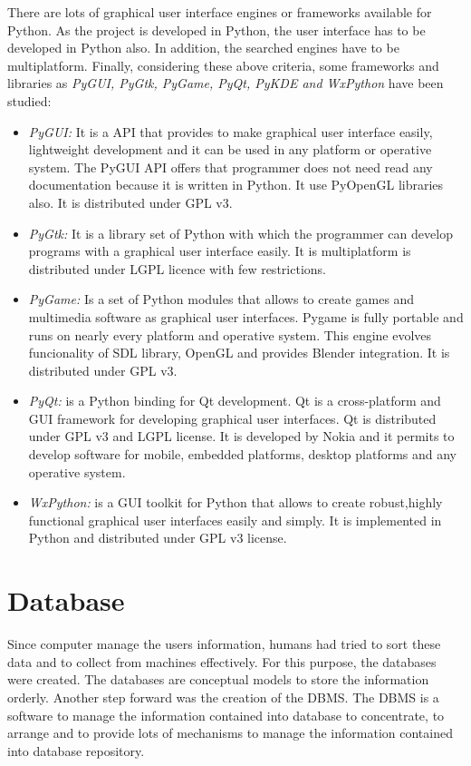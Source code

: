 There are lots of graphical user interface engines or frameworks available for
Python. As the project is developed in Python, the user interface has to be
developed in Python also. In addition, the searched engines have to be
multiplatform. Finally, considering these above criteria, some frameworks and
libraries  as \emph{PyGUI, PyGtk, PyGame, PyQt, PyKDE and WxPython} have been studied:

\begin{itemize}
\item \emph {PyGUI:} It is a \ac{API} that provides to make graphical user interface
  easily, lightweight development and it can be used in any platform or
  operative system. The PyGUI \ac{API} offers that programmer does
  not need read any documentation because it is written in Python. It use
  PyOpenGL libraries also. It is distributed under \ac{GPL} v3.
\item \emph{PyGtk:} It is a library set of Python with which the programmer can
  develop  programs with a graphical user interface easily. It is multiplatform
  is distributed under \ac{LGPL} licence with few restrictions.
\item \emph{PyGame:} Is a set of Python modules that allows to create games and
  multimedia software as graphical user interfaces. Pygame is fully portable and
  runs on nearly every platform and operative system. This engine evolves
  funcionality of \ac{SDL} library, OpenGL and provides Blender integration. It is
  distributed under \ac{GPL} v3.
\item \emph{PyQt:} is a Python binding for Qt development. Qt is a
  cross-platform  and \ac{GUI} framework for  developing graphical user interfaces. Qt
  is distributed under \ac{GPL} v3 and \ac{LGPL} license. It is developed by Nokia and it
  permits to develop software for mobile, embedded platforms, desktop platforms
  and any operative system.
\item \emph{WxPython:} is a \ac{GUI} toolkit for Python that allows to create
  robust,highly functional graphical user interfaces easily and simply. It is
  implemented in Python and distributed under \ac{GPL} v3 license.
\end{itemize}


\section{Database}
Since computer manage the users information, humans had tried to sort these data
and to collect from machines effectively. For this purpose, the databases were
created. The databases are conceptual models to store the information
orderly. Another step forward was the creation of the \ac{DBMS}. The \ac{DBMS}
is a software to manage the information contained into database to concentrate,
to arrange and to provide lots of mechanisms to manage the information contained
into database repository.

